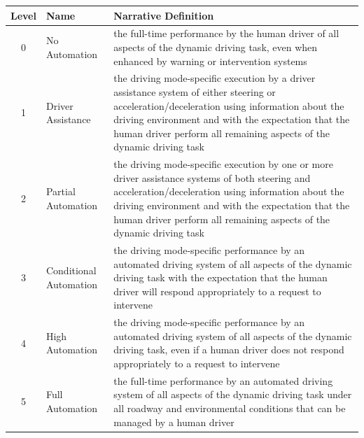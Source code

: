 \begin{center}
	\begin{tabular}{|c | l | p{10cm}|}
		\hline
		\textbf{Level} & \textbf{Name} & \textbf{Narrative Definition}\\ \hline
		0 & No Automation & the full-time performance by the human driver of all aspects of the dynamic driving task, even when enhanced by warning or intervention systems \\ \hline
		1 & Driver Assistance & the driving mode-specific execution by a driver assistance system of either steering or acceleration/deceleration using information about the driving environment and with the expectation that the human driver perform all remaining aspects of the dynamic driving task \\ \hline
		2 & Partial Automation & the driving mode-specific execution by one or more driver assistance systems of both steering and acceleration/deceleration using information	 about the driving environment and with the expectation that the human driver perform all remaining aspects of the dynamic driving task \\ \hline
		3 & Conditional Automation &  the driving mode-specific performance by an automated driving system of all aspects of the dynamic driving task with the expectation that the human driver will respond appropriately to a request to intervene \\ \hline
		4 & High Automation & the driving mode-specific performance by an automated driving system of all aspects of the dynamic driving task, even if a human driver does not respond appropriately to a request to intervene \\ \hline
		5 & Full Automation & the full-time performance by an automated driving system of all aspects of the dynamic driving task under all roadway and environmental conditions that can be managed by a human driver \\ \hline
	\end{tabular}
	\label{tab:autonomy_levels}
\end{center}

